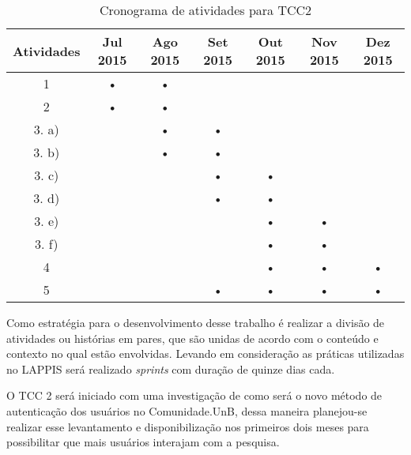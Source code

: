 \begin{table}[h]
    \centering

    \begin{tabular}{|c|c|c|c|c|c|c|}
        \hline
        \textbf{Atividades} & \textbf{Jul 2015} & \textbf{Ago 2015} & \textbf{Set 2015}
        & \textbf{Out 2015} & \textbf{Nov 2015} & \textbf{Dez 2015} \\
        \hline\hline

        \hline
        1   & • & • &   &   &   &   \\

        \hline
        2   & • & • &   &   &   &   \\

        \hline
        3. a)   &   & •  & • &   &   &   \\

        \hline
        3. b)   &   & • & • &   &   &   \\

        \hline
        3. c)   &   &   & • & • &   &   \\

        \hline
        3. d)   &   &   & • & • &   &   \\

        \hline
        3. e)   &   &   &   & • & • &   \\

        \hline
        3. f)   &   &   &   & • & • &   \\

        \hline
        4   &   &   &   & • & • & • \\

        \hline
        5   &   &   & • & • & • & • \\

        \hline
    \end{tabular}

    \caption{Cronograma de atividades para TCC2}
    \label{cronograma}
\end{table}

Como estratégia para o desenvolvimento desse trabalho é realizar a divisão de atividades ou histórias em pares, que são unidas de acordo com o conteúdo e contexto no qual estão envolvidas. Levando em consideração as práticas utilizadas no LAPPIS será realizado \textit{sprints} com duração de quinze dias cada.

O TCC 2 será iniciado com uma investigação de como será o novo método de autenticação dos usuários no Comunidade.UnB, dessa maneira planejou-se realizar esse levantamento e disponibilização nos primeiros dois meses para possibilitar que mais usuários interajam com a pesquisa.

